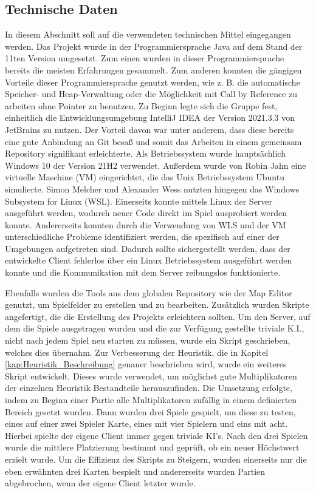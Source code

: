 \documentclass[12pt,a4paper,bibliography=totocnumbered,listof=totocnumbered]{article}
\begin{document}
\subsection{Technische Daten}
In diesem Abschnitt soll auf die verwendeten technischen Mittel eingegangen werden. Das Projekt wurde in der Programmiersprache Java auf dem Stand der 11ten Version umgesetzt. Zum einen wurden in dieser Programmiersprache bereits die meisten Erfahrungen gesammelt. Zum anderen konnten die gängigen Vorteile dieser Programmiersprache genutzt werden, wie z. B. die automatische Speicher- und Heap-Verwaltung oder die Möglichkeit mit \glqq Call by Reference\grqq{} zu arbeiten ohne Pointer zu benutzen.
Zu Beginn legte sich die Gruppe fest, einheitlich die Entwicklungsumgebung IntelliJ IDEA der Version 2021.3.3 von JetBrains zu nutzen. Der Vorteil davon war unter anderem, dass diese bereits eine gute Anbindung an Git besaß und somit das Arbeiten in einem gemeinsam Repository signifikant erleichterte.
Als Betriebssystem wurde hauptsächlich Windows 10 der Version 21H2 verwendet. Außerdem wurde von Robin Jahn eine virtuelle Maschine (VM) eingerichtet, die das Unix Betriebssystem Ubuntu simulierte. Simon Melcher und Alexander Wess nutzten hingegen das Windows Subsystem for Linux (WSL). Einerseits konnte mittels Linux der Server ausgeführt werden, wodurch neuer Code direkt im Spiel ausprobiert werden konnte. Andererseits konnten durch die Verwendung von WLS und der VM unterschiedliche Probleme identifiziert werden, die spezifisch auf einer der Umgebungen aufgetreten sind. Dadurch sollte sichergestellt werden, dass der entwickelte Client fehlerlos über ein Linux Betriebssystem ausgeführt werden konnte und die Kommunikation mit dem Server reibungslos funktionierte.

Ebenfalls wurden die Tools aus dem globalen Repository wie der Map Editor genutzt, um Spielfelder zu erstellen und zu bearbeiten. Zusätzlich wurden Skripte angefertigt, die die Erstellung des Projekts erleichtern sollten. Um den Server, auf dem die Spiele ausgetragen wurden und die zur Verfügung gestellte triviale K.I., nicht nach jedem Spiel neu starten zu müssen, wurde ein Skript geschrieben, welches dies übernahm. Zur Verbesserung der Heuristik, die in Kapitel \ref{kap:Heuristik_Beschreibung} genauer beschrieben wird, wurde ein weiteres Skript entwickelt. Dieses wurde verwendet, um möglichst gute Multiplikatoren der einzelnen Heuristik Bestandteile herauszufinden. Die Umsetzung erfolgte, indem zu Beginn einer Partie alle Multiplikatoren zufällig in einem definierten Bereich gesetzt wurden. Dann wurden drei Spiele gespielt, um diese zu testen, eines auf einer zwei Spieler Karte, eines mit vier Spielern und eins mit acht. Hierbei spielte der eigene Client immer gegen triviale KI's. Nach den drei Spielen wurde die mittlere Platzierung bestimmt und geprüft, ob ein neuer Höchstwert erzielt wurde. Um die Effizienz des Skripts zu Steigern, wurden einerseits nur die eben erwähnten drei Karten bespielt und andererseits wurden Partien abgebrochen, wenn der eigene Client letzter wurde.
\end{document}
